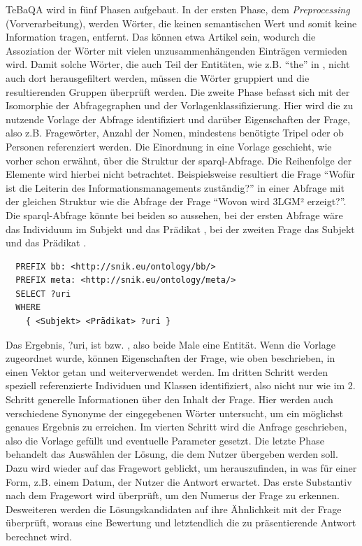 TeBaQA wird in fünf Phasen aufgebaut.
In der ersten Phase, dem \emph{Preprocessing} (Vorverarbeitung), werden Wörter, die keinen semantischen Wert und somit keine Information tragen, entfernt.
Das können etwa Artikel sein, wodurch die Assoziation der Wörter mit vielen unzusammenhängenden Einträgen vermieden wird.
Damit solche Wörter, die auch Teil der Entitäten, wie z.B. \enquote{the} in ,
nicht auch dort herausgefiltert werden, müssen die Wörter gruppiert und die resultierenden Gruppen überprüft werden.
Die zweite Phase befasst sich mit der Isomorphie der Abfragegraphen und der Vorlagenklassifizierung.
Hier wird die zu nutzende Vorlage der Abfrage identifiziert und darüber Eigenschaften der Frage, also z.B. Fragewörter,
Anzahl der Nomen, mindestens benötigte Tripel oder ob Personen referenziert werden.
Die Einordnung in eine Vorlage geschieht, wie vorher schon erwähnt, über die Struktur der \ac{sparql}-Abfrage.
Die Reihenfolge der Elemente wird hierbei nicht betrachtet.
Beispielsweise resultiert die Frage \enquote{Wofür ist die Leiterin des Informationsmanagements zuständig?}
in einer Abfrage mit der gleichen Struktur wie die Abfrage der Frage \enquote{Wovon wird 3LGM² erzeigt?}.
Die \ac{sparql}-Abfrage könnte bei beiden so aussehen, bei der ersten Abfrage wäre das Individuum im Subjekt  und das Prädikat ,
bei der zweiten Frage das Subjekt  und das Prädikat .
\begin{lstlisting}
  PREFIX bb: <http://snik.eu/ontology/bb/>
  PREFIX meta: <http://snik.eu/ontology/meta/>
  SELECT ?uri
  WHERE
    { <Subjekt> <Prädikat> ?uri }
\end{lstlisting}
Das Ergebnis, ?uri, ist  bzw. , also beide Male eine Entität.
Wenn die Vorlage zugeordnet wurde, können Eigenschaften der Frage, wie oben beschrieben, in einen Vektor getan und weiterverwendet werden.
Im dritten Schritt werden speziell referenzierte Individuen und Klassen identifiziert, also nicht nur wie im 2. Schritt generelle Informationen über den Inhalt der Frage.
Hier werden auch verschiedene Synonyme der eingegebenen Wörter untersucht, um ein möglichst genaues Ergebnis zu erreichen.
Im vierten Schritt wird die Anfrage geschrieben, also die Vorlage gefüllt und eventuelle Parameter gesetzt.
Die letzte Phase behandelt das Auswählen der Lösung, die dem Nutzer übergeben werden soll.
Dazu wird wieder auf das Fragewort geblickt, um herauszufinden, in was für einer Form, z.B. einem Datum, der Nutzer die Antwort erwartet.
Das erste Substantiv nach dem Fragewort wird überprüft, um den Numerus der Frage zu erkennen.
Desweiteren werden die Lösungskandidaten auf ihre Ähnlichkeit mit der Frage überprüft, woraus eine Bewertung und letztendlich die zu präsentierende Antwort berechnet wird.

